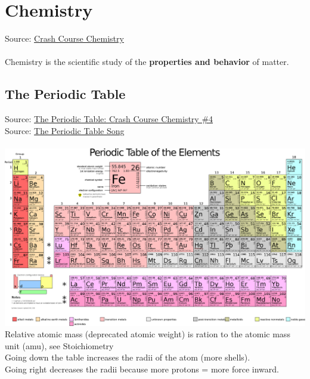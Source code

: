 \newcommand\el[2]{\text{#1}_{#2}}
\newcommand\sucrose{\overbrace{\el{C}{12}\el{H}{22}\el{O}{11}}^{\text{sucrose}}}
\newcommand\oxygen{\el{O}{2}}
\newcommand\carbonDioxide{\el{C}{}\el{O}{2}}
\newcommand\water{\el{H}{2}\el{O}{}}

\section{Chemistry}
Source: \href{https://www.youtube.com/watch?v=uVFCOfSuPTo&list=PL8dPuuaLjXtPHzzYuWy6fYEaX9mQQ8oGr}{Crash Course Chemistry}
\\\\
Chemistry is the scientific study of the \textbf{properties and behavior} of matter.

\subsection{The Periodic Table}
Source: \href{https://www.youtube.com/watch?v=0RRVV4Diomg&list=PL8dPuuaLjXtPHzzYuWy6fYEaX9mQQ8oGr&index=5}{The Periodic Table: Crash Course Chemistry \#4}\\
Source: \href{https://www.youtube.com/watch?v=rz4Dd1I_fX0}{The Periodic Table Song}
\\\\
\includegraphics[width=\textwidth]{./chemistry/imgs/ptoe.png}
\\
Relative atomic mass (deprecated atomic weight) is ration to the atomic mass unit (amu), see Stoichiometry\\
Going down the table increases the radii of the atom (more shells).\\
Going right decreases the radii because more protons = more force inward.

